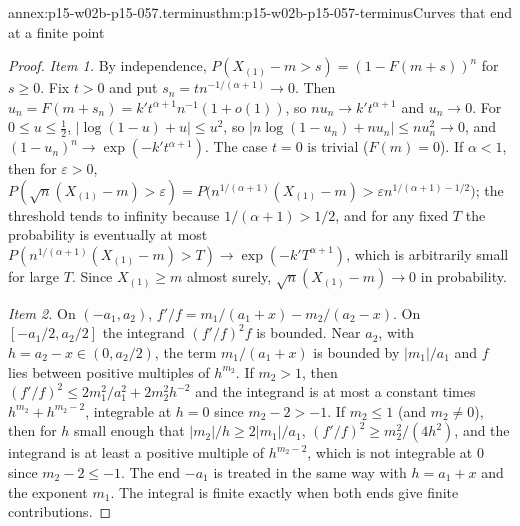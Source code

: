 \begin{annexitem}{annex:p15-w02b-p15-057.terminus}{thm:p15-w02b-p15-057-terminus}{Curves that end at a finite point}
\begin{proof}
\emph{Item 1.} By independence,
\(P(X_{(1)}-m>s)=(1-F(m+s))^n\) for \(s\geq0\). Fix \(t>0\) and put
\(s_n=tn^{-1/(\alpha+1)}\to0\). Then
\(u_n=F(m+s_n)=k't^{\alpha+1}n^{-1}(1+o(1))\), so \(nu_n\to k't^{\alpha+1}\)
and \(u_n\to0\). For \(0\leq u\leq\frac12\),
\(|\log(1-u)+u|\leq u^2\), so \(|n\log(1-u_n)+nu_n|\leq nu_n^2\to0\), and
\((1-u_n)^n\to\exp(-k't^{\alpha+1})\). The case \(t=0\) is trivial
(\(F(m)=0\)). If \(\alpha<1\), then for \(\varepsilon>0\),
\(P(\sqrt n(X_{(1)}-m)>\varepsilon)=P\bigl(n^{1/(\alpha+1)}(X_{(1)}-m)
>\varepsilon n^{1/(\alpha+1)-1/2}\bigr)\); the threshold tends to
infinity because \(1/(\alpha+1)>1/2\), and for any fixed \(T\) the
probability is eventually at most
\(P(n^{1/(\alpha+1)}(X_{(1)}-m)>T)\to\exp(-k'T^{\alpha+1})\), which is
arbitrarily small for large \(T\). Since \(X_{(1)}\geq m\) almost surely,
\(\sqrt n(X_{(1)}-m)\to0\) in probability.

\emph{Item 2.} On \((-a_1,a_2)\),
\(f'/f=m_1/(a_1+x)-m_2/(a_2-x)\). On \([-a_1/2,a_2/2]\) the integrand
\((f'/f)^2f\) is bounded. Near \(a_2\), with \(h=a_2-x\in(0,a_2/2)\), the
term \(m_1/(a_1+x)\) is bounded by \(|m_1|/a_1\) and \(f\) lies between
positive multiples of \(h^{m_2}\). If \(m_2>1\), then
\((f'/f)^2\leq2m_1^2/a_1^2+2m_2^2h^{-2}\) and the integrand is at most a
constant times \(h^{m_2}+h^{m_2-2}\), integrable at \(h=0\) since
\(m_2-2>-1\). If \(m_2\leq1\) (and \(m_2\neq0\)), then for \(h\) small
enough that \(|m_2|/h\geq2|m_1|/a_1\),
\((f'/f)^2\geq m_2^2/(4h^2)\), and the integrand is at least a positive
multiple of \(h^{m_2-2}\), which is not integrable at \(0\) since
\(m_2-2\leq-1\). The end \(-a_1\) is treated in the same way with
\(h=a_1+x\) and the exponent \(m_1\). The integral is finite exactly when
both ends give finite contributions.
\end{proof}
\end{annexitem}


